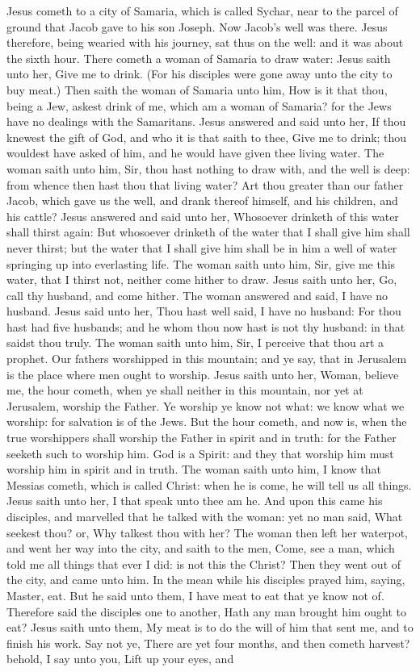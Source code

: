  Jesus cometh to a city of Samaria, which is called Sychar, near to the parcel of ground that Jacob gave to his son Joseph. Now Jacob's well was there. Jesus therefore, being wearied with his journey, sat thus on the well: and it was about the sixth hour. There cometh a woman of Samaria to draw water: Jesus saith unto her, Give me to drink. (For his disciples were gone away unto the city to buy meat.) Then saith the woman of Samaria unto him, How is it that thou, being a Jew, askest drink of me, which am a woman of Samaria? for the Jews have no dealings with the Samaritans. Jesus answered and said unto her, If thou knewest the gift of God, and who it is that saith to thee, Give me to drink; thou wouldest have asked of him, and he would have given thee living water. The woman saith unto him, Sir, thou hast nothing to draw with, and the well is deep: from whence then hast thou that living water? Art thou greater than our father Jacob, which gave us the well, and drank thereof himself, and his children, and his cattle? Jesus answered and said unto her, Whosoever drinketh of this water shall thirst again: But whosoever drinketh of the water that I shall give him shall never thirst; but the water that I shall give him shall be in him a well of water springing up into everlasting life. The woman saith unto him, Sir, give me this water, that I thirst not, neither come hither to draw. Jesus saith unto her, Go, call thy husband, and come hither. The woman answered and said, I have no husband. Jesus said unto her, Thou hast well said, I have no husband: For thou hast had five husbands; and he whom thou now hast is not thy husband: in that saidst thou truly. The woman saith unto him, Sir, I perceive that thou art a prophet. Our fathers worshipped in this mountain; and ye say, that in Jerusalem is the place where men ought to worship. Jesus saith unto her, Woman, believe me, the hour cometh, when ye shall neither in this mountain, nor yet at Jerusalem, worship the Father. Ye worship ye know not what: we know what we worship: for salvation is of the Jews. But the hour cometh, and now is, when the true worshippers shall worship the Father in spirit and in truth: for the Father seeketh such to worship him. God is a Spirit: and they that worship him must worship him in spirit and in truth. The woman saith unto him, I know that Messias cometh, which is called Christ: when he is come, he will tell us all things. Jesus saith unto her, I that speak unto thee am he. And upon this came his disciples, and marvelled that he talked with the woman: yet no man said, What seekest thou? or, Why talkest thou with her? The woman then left her waterpot, and went her way into the city, and saith to the men, Come, see a man, which told me all things that ever I did: is not this the Christ? Then they went out of the city, and came unto him. In the mean while his disciples prayed him, saying, Master, eat. But he said unto them, I have meat to eat that ye know not of. Therefore said the disciples one to another, Hath any man brought him ought to eat? Jesus saith unto them, My meat is to do the will of him that sent me, and to finish his work. Say not ye, There are yet four months, and then cometh harvest? behold, I say unto you, Lift up your eyes, and 